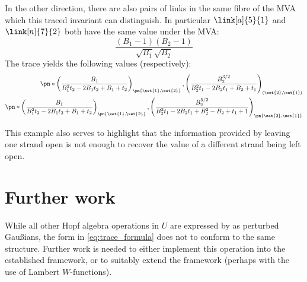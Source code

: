 In the other direction, there are also pairs of links in the same fibre of the
\ac{MVA} which this traced invariant can distinguish. In particular
$\link[a]{5}{1}$ and $\link[n]{7}{2}$ both have the same value under the
\ac{MVA}:
\begin{equation}
        \frac{\left(B_1-1\right) \left(B_2-1\right)}{\sqrt{B_1} \sqrt{B_2}}
\end{equation}
The trace yields the following values (respectively):
\begin{align}
\pn*{
                \left(
                        \frac{B_1}{B_1^2 t_2  -2 B_1 t_2  +B_1+t_2 
                }\right)_{\pn{\set{1},\set{2}}}
                ,\left(\frac{B_2^{3/2}}{B_2^2 t_1  -2 B_2 t_1  +B_2+t_1 
        }\right)_{(\set{2},\set{1})}
}\\
        \pn*{
          \left(\frac{B_1}{B_1^2 t_2  -2 B_1 t_2  +B_1+t_2 
        }\right)_{\pn{\set{1},\set{2}}},\left(\frac{B_2^{5/2}}{B_2^2 t_1  -2 B_2 t_1  +B_2^2-B_2+t_1  +1}\right)_{\pn{\set{2},\set{1}}}} 
\end{align}

This example also serves to highlight that the information provided by leaving
one strand open is not enough to recover the value of a different strand being
left open.

\section{Further work}
While all other Hopf algebra operations in $U$ are expressed by \cite{BV} as
perturbed Gaußians, the form in \cref{eq:trace_formula} does not to conform to
the same structure. Further work is needed to either implement this operation
into the established framework, or to suitably extend the framework (perhaps
with the use of Lambert $W$-functions).
